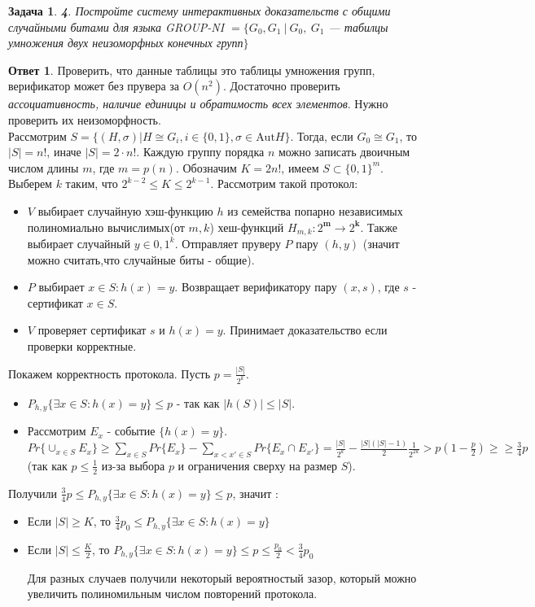 \documentclass[a4paper]{article}
\theoremstyle{plain}
\newtheorem*{task}{Задача}
\theoremstyle{definition}
\newtheorem*{answer}{Ответ}
\begin{document}
\begin{task}{\textbf 4.}
Постройте систему интерактивных доказательств с общими случайными битами для языка \textsf{GROUP-NI} $=\{G_0, G_1 \ |\ G_0,\ G_1$ --- табилцы умножения двух неизоморфных конечных групп$\}$
\end{task}
\begin{answer}  
Проверить, что данные таблицы это таблицы умножения групп, верификатор может без прувера за $O(n^2)$. Достаточно проверить \textit{ассоциативность, наличие единицы и обратимость всех элементов}. Нужно проверить их неизоморфность. 
\\Рассмотрим $S = \{(H,\sigma) | H \cong G_i , i \in \{0,1\}, \sigma \in \text{Aut} H\}$. Тогда, если $G_0 \cong G_1$, то $|S| = n!$, иначе $|S| = 2 \cdot n!$. Каждую группу порядка $n$ можно записать двоичным числом длины $m$, где $m = p(n)$. Обозначим $K = 2 n!$, имеем $S \subset \{0,1\}^m$. Выберем $k$ таким, что $ 2^{k-2} \leq K \leq 2^{k-1}$. Рассмотрим такой протокол: \\
\begin{itemize} 
\item $V$ выбирает случайную хэш-функцию $h$ из семейства попарно независимых полиномиально вычислимых(от $m,k$) хеш-функций
 $H_{m,k}: 2^\mathbf{m} \to 2^\mathbf{k}$. Также выбирает случайный $y \in {0,1}^k$. Отправляет пруверу $P$  пару $(h,y)$ (значит можно считать,что случайные биты - общие).
\item $P$ выбирает $x \in S : h(x) = y$. Возвращает верификатору пару $(x,s)$, где $s$ - сертификат $x \in S$.
\item $V$ проверяет сертификат $s$ и $h(x) = y$. Принимает доказательство если проверки корректные. 
\end{itemize}
Покажем корректность протокола. Пусть $p = \frac{|S|}{2^k}$. 
\begin{itemize} 
\item  $P_{h,y} \{ \exists x \in S : h(x) = y \} \leq p$ - так как $|h(S)| \leq |S|$.
\item Рассмотрим $E_x$ - событие $\{ h(x) = y\}$. $Pr \{ \cup_{x \in S} E_x \} \geq \sum_{x \in S} Pr\{E_x\} 
- \sum_{x < x' \in S} Pr \{ E_x \cap E_{x'} \} = \frac{|S|}{2^k} - \frac{|S|(|S| - 1)}{2} \frac{1}{2^{2k}} > p(1 - \frac{p}{2}) \geq 
 \geq \frac{3}{4} p$ (так как $p \leq \frac{1}{2}$ из-за выбора $p$ и ограничения сверху на размер $S$).   
\end{itemize}
Получили $\frac{3}{4} p \leq  P_{h,y} \{ \exists x \in S : h(x) = y \} \leq p$, значит :
\begin{itemize} 
\item Если $|S| \geq K$, то $\frac{3}{4} p_0 \leq  P_{h,y} \{ \exists x \in S : h(x) = y \}$
\item Если $|S| \leq \frac{K}{2}$, то $P_{h,y} \{ \exists x \in S : h(x) = y \} \leq p \leq \frac{p_0}{2} < \frac{3}{4} p_0$
 
Для разных случаев получили некоторый вероятностый зазор, который можно увеличить полиномильным числом повторений протокола. 

\end{itemize}
\end{answer}
\end{document}
